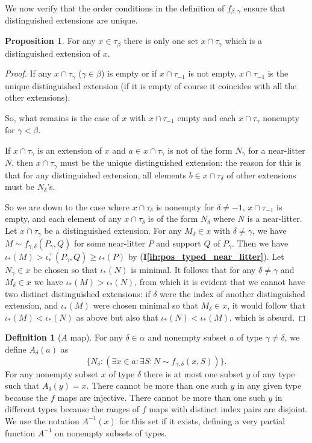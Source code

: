 \documentclass[112pt]{article}
\theoremstyle{definition}
\newtheorem{proposition}[theorem]{Proposition}
\newtheorem{definition}[theorem]{Definition}
\theoremstyle{remark}
\newcommand{\ihref}[1]{(\textbf{I\ref{#1}})}
\begin{document}
We now verify that the order conditions in the definition of $f_{\beta,\gamma}$ ensure that distinguished extensions are unique.
\begin{proposition}\label{prop:distinguished_extension_unique}
{For any $x \in \tau_\beta$ there is only one set $x \cap \tau_\gamma$ which is a distinguished extension of $x$.}
\end{proposition}
\begin{proof}
If any $x \cap \tau_\gamma$ ($\gamma \in \beta$) is empty or if $x \cap \tau_{-1}$ is not empty, $x \cap \tau_{-1}$ is the unique distinguished extension
(if it is empty of course it coincides with all the other extensions).

So, what remains is the case of $x$ with $x \cap \tau_{-1}$ empty and each $x \cap \tau_\gamma$ nonempty for $\gamma<\beta$.

If $x \cap \tau_\gamma$ is an extension of $x$ and $a \in x \cap \tau_\gamma$ is not of the form $N_\gamma$ for a near-litter $N$, then
$x \cap \tau_\gamma$ must be the unique distinguished extension:  the reason for this is that for any distinguished extension, all elements $b \in x \cap \tau_\delta$ of other extensions must be $N_\delta$'s.

So we are down to the case where $x \cap \tau_\delta$ is nonempty for $\delta \neq -1$, $x \cap \tau_{-1}$ is empty, and each element of
any $x \cap \tau_\delta$ is of the form $N_\delta$ where $N$ is a near-litter.  Let $x \cap \tau_\gamma$ be a distinguished extension.
For any $M_\delta \in x$ with $\delta \neq \gamma$, we have $M \sim f_{\gamma,\delta}(P_\gamma,Q)$ for some near-litter $P$ and support $Q$
of $P_\gamma$.  Then we have $\iota_*(M) > \iota^+_*(P_\gamma,Q) \geq \iota_*(P)$ {by \ihref{ih:pos_typed_near_litter}}.  Let $N_\gamma\in x$ be chosen so that $\iota_*(N)$ is minimal.
It follows that for any $\delta \neq \gamma$ and $M_\delta \in x$ we have $\iota_*(M) > \iota_*(N)$, from which it is evident that we cannot have two distinct distinguished extensions:
if $\delta$ were the index of another distinguished extension, and $\iota_*(M)$ were chosen minimal so that $M_\delta \in x$, it would follow that $\iota_*(M)<\iota_*(N)$ as above
but also that $\iota_*(N) < \iota_*(M)$, which is absurd.
\end{proof}

\begin{definition}[$A$ map]\label{def:a_map}
For any $\delta \in \alpha$ and nonempty subset $a$ of type $\gamma \neq \delta$, we define $A_\delta(a)$ as $$\{N_\delta:(\exists x \in a:\exists S:N \sim f_{\gamma,\delta}(x,S))\}.$$  For any nonempty subset $x$ of type $\delta$ there is at most one subset $y$ of any type such that $A_\delta(y)=x$.  There cannot be more than one such $y$ in any given type because the $f$ maps are injective.  There cannot be more than one such $y$ in different types because the ranges of $f$ maps with distinct index pairs are disjoint.   We use the notation $A^{-1}(x)$ for this set if it exists, defining a very partial function $A^{-1}$ on nonempty subsets of types.
\end{definition}
\end{document}
